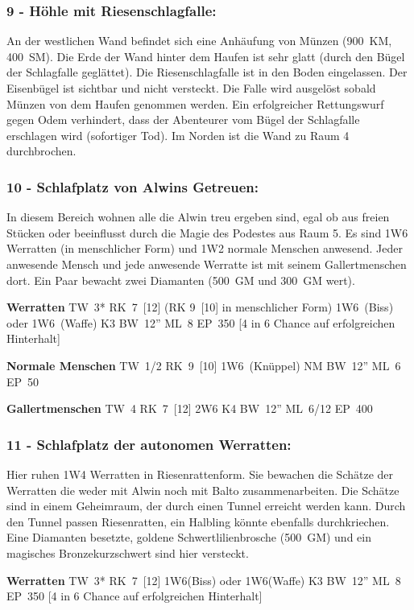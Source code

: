 \subsubsection{9 - Höhle mit Riesenschlagfalle:} An der westlichen Wand
befindet sich eine Anhäufung von Münzen (900~KM, 400~SM). Die Erde der Wand
hinter dem Haufen ist sehr glatt (durch den Bügel der Schlagfalle geglättet).
Die Riesenschlagfalle ist in den Boden eingelassen. Der Eisenbügel ist sichtbar
und nicht versteckt. Die Falle wird ausgelöst sobald Münzen von dem Haufen
genommen werden. Ein erfolgreicher Rettungswurf gegen Odem
verhindert, dass der
Abenteurer vom Bügel der Schlagfalle erschlagen wird (sofortiger Tod). Im
Norden ist die Wand zu Raum 4 durchbrochen.

\subsubsection{10 - Schlafplatz von Alwins Getreuen:} In diesem Bereich wohnen
alle die Alwin treu ergeben sind, egal ob aus freien Stücken oder beeinflusst
durch die Magie des Podestes aus Raum 5. Es sind 1W6 Werratten (in menschlicher
Form) und 1W2 normale Menschen anwesend. Jeder anwesende Mensch und jede
anwesende Werratte ist mit seinem Gallertmenschen dort. Ein Paar bewacht zwei
Diamanten (500~GM und 300~GM wert).

\textbf{Werratten} TW~3* RK~7~[12] (RK 9~[10] in menschlicher Form)
1W6~(Biss) oder 1W6~(Waffe) K3 BW~12'' ML~8 EP~350 [4 in 6 Chance
auf erfolgreichen Hinterhalt] 

\textbf{Normale Menschen} TW~1/2 RK~9~[10] 1W6~(Knüppel) NM BW~12'' ML~6 EP~50 

\textbf{Gallertmenschen} TW~4 RK~7~[12] 2W6 K4 BW~12'' ML~6/12 EP~400

\subsubsection{11 - Schlafplatz der autonomen Werratten:} Hier ruhen 1W4
Werratten in Riesenrattenform. Sie bewachen die Schätze der Werratten die weder
mit Alwin noch mit Balto zusammenarbeiten. Die Schätze sind in einem
Geheimraum, der durch einen Tunnel erreicht werden kann. Durch den Tunnel
passen Riesenratten, ein Halbling könnte ebenfalls durchkriechen. Eine
Diamanten besetzte, goldene Schwertlilienbrosche (500~GM) und ein magisches
Bronzekurzschwert sind hier versteckt.

\textbf{Werratten} TW~3* RK~7~[12] 1W6(Biss) oder 1W6(Waffe) K3 BW~12'' ML~8 EP~350
[4 in 6 Chance auf erfolgreichen Hinterhalt] 


